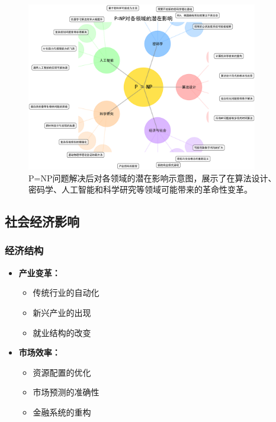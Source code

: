 \documentclass[a4paper,12pt]{ctexart}
\begin{document}
\begin{figure}[H]
    \centering
    \includegraphics[width=0.9\textwidth]{img/pnp_impact.png}
    \caption{P=NP问题解决后对各领域的潜在影响示意图，展示了在算法设计、密码学、人工智能和科学研究等领域可能带来的革命性变革。}
    \label{fig:pnp_impact}
\end{figure}

\subsection{社会经济影响}
\subsubsection{经济结构}
\begin{itemize}
    \item \textbf{产业变革：}
        \begin{itemize}
            \item 传统行业的自动化
            \item 新兴产业的出现
            \item 就业结构的改变
        \end{itemize}
    \item \textbf{市场效率：}
        \begin{itemize}
            \item 资源配置的优化
            \item 市场预测的准确性
            \item 金融系统的重构
        \end{itemize}
\end{itemize}
\end{document}
